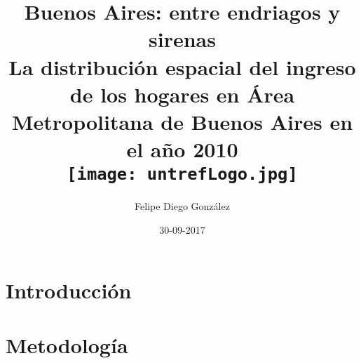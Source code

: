 \documentclass{report}
\title{
	{Buenos Aires: entre endriagos y sirenas}\\
	{\large La distribución espacial del ingreso de los hogares en Área Metropolitana de Buenos Aires en el año 2010}\\
	{\texttt{[image: untrefLogo.jpg]}}
}
\author{Felipe Diego González}
\date{30-09-2017}
\begin{document}
  	\maketitle
  	
  	\tableofcontents
  	
  	\chapter{Introducción}

  	\chapter{Metodología}
  	
	  	
	
  		
  	 
  		
  	  	  
  	
  
\end{document}

